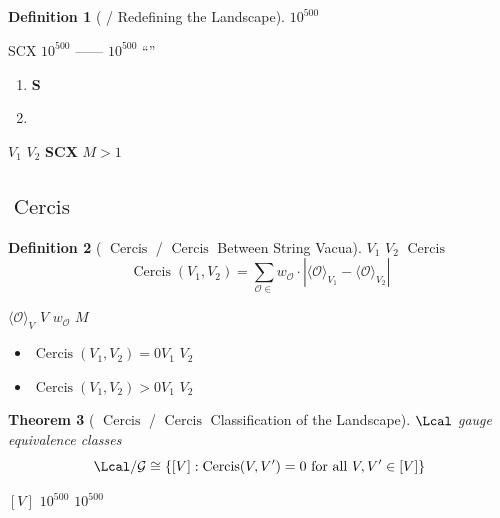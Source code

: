 \documentclass[12pt,a4paper]{article}
\theoremstyle{plain}
\newtheorem{theorem}{ Theorem}[section]
\theoremstyle{definition}
\newtheorem{definition}[theorem]{ Definition}
\newcommand{\Gauge}{\mathcal{G}}
\newcommand{\Ocal}{\mathcal{O}}
\DeclareMathOperator{\Cercis}{Cercis}
\begin{document}
\subsection{}

\begin{definition}[ / Redefining the Landscape]
 $10^{500}$ \textbf{}


SCX  $10^{500}$ \textbf{}——
$10^{500}$ ``''

\begin{enumerate}
    \item \textbf{} \textbf{ S }
    
    \item \textbf{} \textbf{}
    
\end{enumerate}
\end{definition}

\begin{scxbox}
\textbf{}  $V_1$  $V_2$
\textbf{SCX }  $M > 1$ 

\end{scxbox}


\subsection{$\Cercis$ }

\begin{definition}[ $\Cercis$ / $\Cercis$ Between String Vacua]
 $V_1$  $V_2$  $\Cercis$ 
\begin{equation}
    \Cercis(V_1, V_2) = \sum_{\Ocal \in \text{}} w_\Ocal \cdot
    \left| \langle \Ocal \rangle_{V_1} - \langle \Ocal \rangle_{V_2} \right|
\end{equation}

 $\langle \Ocal \rangle_V$  $V$ 
$w_\Ocal$  $M$ 

\textbf{}
\begin{itemize}
    \item $\Cercis(V_1, V_2) = 0$$V_1$  $V_2$ 
    \item $\Cercis(V_1, V_2) > 0$$V_1$  $V_2$ 
\end{itemize}
\end{definition}

\begin{theorem}[ $\Cercis$  / $\Cercis$ Classification of the Landscape]
 $\Lcal$ \textbf{}gauge equivalence classes
\begin{equation}
    \Lcal / \Gauge \cong \{ [V] : \Cercis(V, V') = 0 \text{ for all } V, V' \in [V] \}
\end{equation}

 $[V]$ \textbf{}
$10^{500}$  $10^{500}$ 
\end{theorem}
\end{document}
